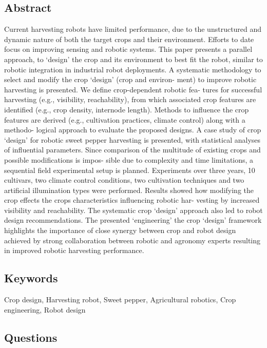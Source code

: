 \subsection*{Abstract}
Current harvesting robots have limited performance, due to the unstructured and dynamic
nature of both the target crops and their environment. Efforts to date focus on improving
sensing and robotic systems. This paper presents a parallel approach, to ‘design’ the crop
and its environment to best fit the robot, similar to robotic integration in industrial robot
deployments.
A systematic methodology to select and modify the crop ‘design’ (crop and environ-
ment) to improve robotic harvesting is presented. We define crop-dependent robotic fea-
tures for successful harvesting (e.g., visibility, reachability), from which associated crop
features are identified (e.g., crop density, internode length). Methods to influence the crop
features are derived (e.g., cultivation practices, climate control) along with a methodo-
logical approach to evaluate the proposed designs. A case study of crop ‘design’ for robotic
sweet pepper harvesting is presented, with statistical analyses of influential parameters.
Since comparison of the multitude of existing crops and possible modifications is impos-
sible due to complexity and time limitations, a sequential field experimental setup is
planned. Experiments over three years, 10 cultivars, two climate control conditions, two
cultivation techniques and two artificial illumination types were performed. Results
showed how modifying the crop effects the crops characteristics influencing robotic har-
vesting by increased visibility and reachability. The systematic crop ‘design’ approach also
led to robot design recommendations. The presented ‘engineering’ the crop ‘design’
framework highlights the importance of close synergy between crop and robot design
achieved by strong collaboration between robotic and agronomy experts resulting in
improved robotic harvesting performance.


\subsection*{Keywords}
Crop design, Harvesting robot, Sweet pepper, Agricultural robotics, Crop engineering, Robot design


\subsection*{Questions}
